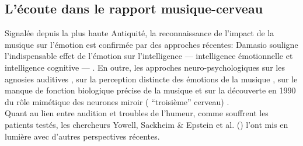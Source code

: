 \subsection{ L'écoute dans le rapport musique-cerveau}
Signalée depuis la plus haute Antiquité,  la reconnaissance de
l'impact de la musique sur l'émotion est confirmée par
des approches récentes: Damasio
souligne l'indispensable effet de l'émotion
sur l'intelligence   ---     intelligence émotionnelle et intelligence
  cognitive --- \autocite {damasio:lautre}.
En outre, les approches neuro-psychologiques sur les agnosies
  auditives \autocite{seron.baron.ea:neuropsychologie},
sur la perception distincte des émotions de la musique
\autocite{platel_neuropsychology_2002},
sur  
 le
manque de fonction biologique précise de la musique \autocite {bigand:cerveau}
et sur la
découverte en 1990 du rôle mimétique des neurones miroir ( ``troisième''
cerveau) \autocite{Rizzolati}.
\\
Quant au lien entre audition et troubles de l'humeur, comme souffrent
les patients testés, les chercheurs Yowell, Sackheim \& Epstein et al. (\citeyear{Yowell}) l'ont mis en 
lumière 
 avec  d'autres perspectives
récentes.
